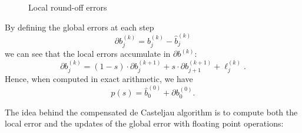 \documentclass[letterpaper,10pt]{article}
\theoremstyle{definition}
\begin{document}
\begin{figure}[H]
\centering
{}
\caption{Local round-off errors}
\end{figure}

\noindent By defining the global errors at each step
\begin{equation}
  \partial b_j^{(k)} = b_j^{(k)} - \widehat{b}_j^{(k)}
\end{equation}
we can see that the local errors accumulate in
\(\partial b^{(k)}\):
\begin{equation}
  \partial b_j^{(k)} = (1 - s) \cdot \partial b_j^{(k + 1)} + s \cdot
  \partial b_{j + 1}^{(k + 1)} + \ell_j^{(k)}.
\end{equation}
Hence, when computed in exact arithmetic, we have
\begin{equation}
  p(s) = \widehat{b}_0^{(0)} + \partial b_0^{(0)}.
\end{equation}

The idea behind the compensated de Casteljau algorithm
is to compute both the local error and the updates of the global
error with floating point operations:
\end{document}
